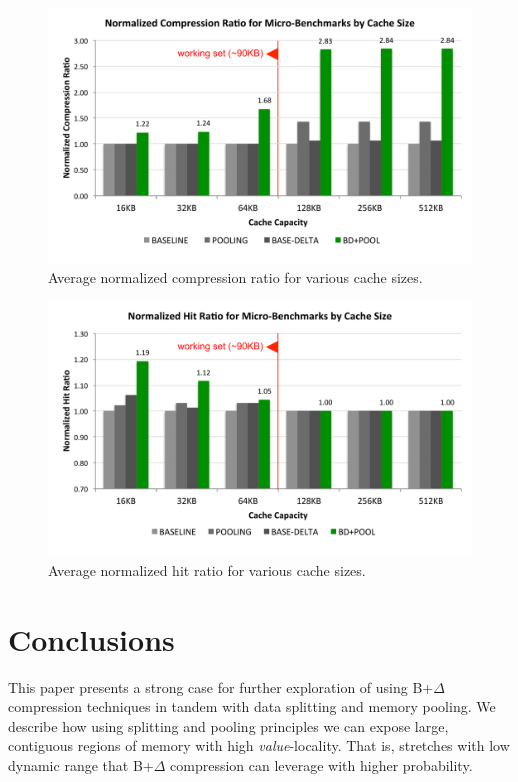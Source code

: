 \documentclass[pageno]{jpaper}
\begin{document}
\begin{figure}
  \centering
    \includegraphics[width=\linewidth]{size2compression.pdf}
  \caption{Average normalized compression ratio for various cache sizes.}
\end{figure}

\begin{figure}
  \centering
    \includegraphics[width=\linewidth]{size2hits.pdf}
  \caption{Average normalized hit ratio for various cache sizes.}
\end{figure}


\section{Conclusions}
This paper presents a strong case for further exploration of using B+$\Delta$ compression techniques in tandem with data splitting and memory pooling. We describe how using splitting and pooling principles we can expose large, contiguous regions of memory with high \textit{value}-locality. That is, stretches with low dynamic range that B+$\Delta$ compression can leverage with higher probability.
\end{document}
